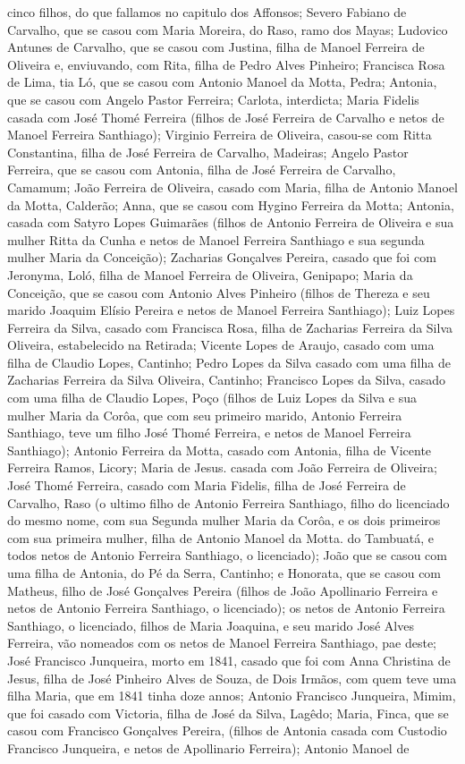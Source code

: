 cinco filhos, do que fallamos no capitulo dos Affonsos; Severo Fabiano de Carvalho, que se casou com Maria Moreira, do Raso, ramo dos Mayas; Ludovico Antunes de Carvalho, que se casou com Justina, filha de Manoel Ferreira de Oliveira e, enviuvando, com Rita, filha de Pedro Alves Pinheiro; Francisca Rosa de Lima, tia Ló, que se casou com Antonio Manoel da Motta, Pedra; Antonia, que se casou com Angelo Pastor Ferreira; Carlota, interdicta; Maria Fidelis casada com José Thomé Ferreira (filhos de José Ferreira de Carvalho e netos de Manoel Ferreira Santhiago); Virginio Ferreira de Oliveira, casou-se com Ritta Constantina, filha de José Ferreira de Carvalho, Madeiras; Angelo Pastor Ferreira, que se casou com Antonia, filha de José Ferreira de Carvalho, Camamum; João Ferreira de Oliveira, casado com Maria, filha de Antonio Manoel da Motta, Calderão; Anna, que se casou com Hygino Ferreira da Motta; Antonia, casada com Satyro Lopes Guimarães (filhos de Antonio Ferreira de Oliveira e sua mulher Ritta da Cunha e netos de Manoel Ferreira Santhiago e sua segunda mulher Maria da Conceição); Zacharias Gonçalves Pereira, casado que foi com Jeronyma, Loló, filha de Manoel Ferreira de Oliveira, Genipapo; Maria da Conceição, que se casou com Antonio Alves Pinheiro (filhos de Thereza\label{elisio} e seu marido Joaquim Elísio Pereira e netos de Manoel Ferreira Santhiago); Luiz Lopes Ferreira da Silva, casado com Francisca Rosa, filha de Zacharias Ferreira da Silva Oliveira, estabelecido na Retirada; Vicente Lopes de Araujo, casado com uma filha de Claudio Lopes, Cantinho; Pedro Lopes da Silva casado com uma filha de Zacharias Ferreira da Silva Oliveira, Cantinho; Francisco Lopes da Silva, casado com uma filha de Claudio Lopes, Poço (filhos de Luiz Lopes da Silva e sua mulher Maria da Corôa, que com seu primeiro marido, Antonio Ferreira Santhiago, teve um filho José Thomé Ferreira, e netos de Manoel Ferreira Santhiago); Antonio Ferreira da Motta, casado com Antonia, filha de Vicente Ferreira Ramos, Licory; Maria de Jesus. casada com João Ferreira de Oliveira; José Thomé Ferreira, casado com Maria Fidelis, filha de José Ferreira de Carvalho, Raso (o ultimo filho de Antonio Ferreira Santhiago, filho do licenciado do mesmo nome, com sua Segunda mulher Maria da Corôa, e os dois primeiros com sua primeira mulher, filha de Antonio Manoel da Motta. do Tambuatá, e todos netos de Antonio Ferreira Santhiago, o licenciado); João que se casou com uma filha de Antonia, do Pé da Serra, Cantinho; e Honorata, que se casou com Matheus, filho de José Gonçalves Pereira (filhos de João Apollinario Ferreira e netos de Antonio Ferreira Santhiago, o licenciado); os netos de Antonio Ferreira Santhiago, o licenciado, filhos de Maria Joaquina, e seu marido José Alves Ferreira, vão nomeados com os netos de Manoel Ferreira Santhiago, pae deste; José Francisco Junqueira, morto em 1841, casado que foi com Anna Christina de Jesus, filha de José Pinheiro Alves de Souza, de Dois Irmãos, com quem teve uma filha Maria, que em 1841 tinha doze annos; Antonio Francisco Junqueira, Mimim, que foi casado com Victoria, filha de José da Silva, Lagêdo; Maria, Finca, que se casou com Francisco Gonçalves Pereira\label{fgpereira}, (filhos de Antonia casada com Custodio Francisco Junqueira, e netos de Apollinario Ferreira); Antonio Manoel de 